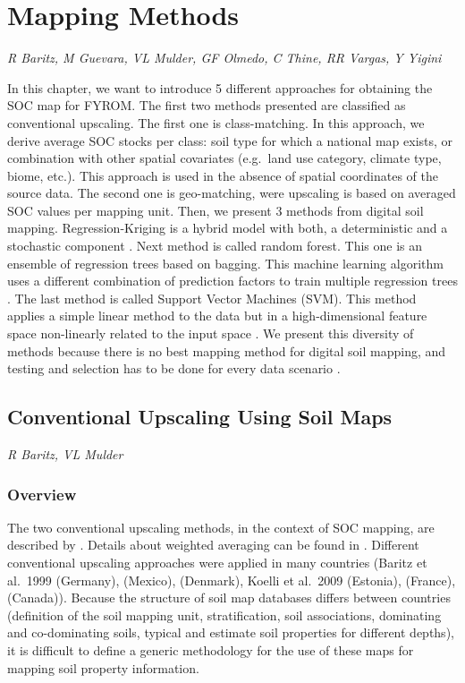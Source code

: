 \documentclass[10pt,b5paper,]{book}
\theoremstyle{definition}
\theoremstyle{definition}
\theoremstyle{definition}
\theoremstyle{remark}
\begin{document}
\hypertarget{mappingMethods}{%
\chapter{Mapping Methods}\label{mappingMethods}}

\emph{R Baritz, M Guevara, VL Mulder, GF Olmedo, C Thine, RR Vargas, Y
Yigini}

In this chapter, we want to introduce 5 different approaches for
obtaining the SOC map for FYROM. The first two methods presented are
classified as conventional upscaling. The first one is class-matching.
In this approach, we derive average SOC stocks per class: soil type for
which a national map exists, or combination with other spatial
covariates (e.g.~land use category, climate type, biome, etc.). This
approach is used in the absence of spatial coordinates of the source
data. The second one is geo-matching, were upscaling is based on
averaged SOC values per mapping unit. Then, we present 3 methods from
digital soil mapping. Regression-Kriging is a hybrid model with both, a
deterministic and a stochastic component \citep{hengl2007regression}.
Next method is called random forest. This one is an ensemble of
regression trees based on bagging. This machine learning algorithm uses
a different combination of prediction factors to train multiple
regression trees \citep{Breiman1996}. The last method is called Support
Vector Machines (SVM). This method applies a simple linear method to the
data but in a high-dimensional feature space non-linearly related to the
input space \citep{Karatzoglou2006}. We present this diversity of
methods because there is no best mapping method for digital soil
mapping, and testing and selection has to be done for every data
scenario \citep{soil-2017-40}.

\hypertarget{conventional-upscaling-using-soil-maps}{%
\section{Conventional Upscaling Using Soil
Maps}\label{conventional-upscaling-using-soil-maps}}

\emph{R Baritz, VL Mulder}

\hypertarget{overview}{%
\subsection{Overview}\label{overview}}

The two conventional upscaling methods, in the context of SOC mapping,
are described by \cite{lettens2004soil}. Details about weighted
averaging can be found in \cite{hiederer2013mapping}. Different
conventional upscaling approaches were applied in many countries (Baritz
et al.~1999 (Germany), \cite{krasilnikov2013soils} (Mexico),
\cite{greve2007generating} (Denmark), Koelli et al.~2009 (Estonia),
\cite{arrouays2001carbon} (France), \cite{bhatti2002estimates}
(Canada)). Because the structure of soil map databases differs between
countries (definition of the soil mapping unit, stratification, soil
associations, dominating and co-dominating soils, typical and estimate
soil properties for different depths), it is difficult to define a
generic methodology for the use of these maps for mapping soil property
information.
\end{document}
